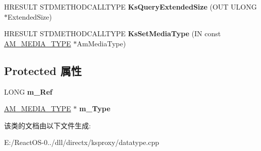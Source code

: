 \begin{DoxyCompactItemize}
\mbox{\label{class_c_ks_data_type_handler_aa5fa030b26b8dccb0db829660826d6d1}} 
H\+R\+E\+S\+U\+LT S\+T\+D\+M\+E\+T\+H\+O\+D\+C\+A\+L\+L\+T\+Y\+PE {\bfseries Ks\+Query\+Extended\+Size} (O\+UT U\+L\+O\+NG $\ast$Extended\+Size)
\item 
\mbox{\label{class_c_ks_data_type_handler_a3fb9e87c052e6c8e18c23ebcfa026bbb}} 
H\+R\+E\+S\+U\+LT S\+T\+D\+M\+E\+T\+H\+O\+D\+C\+A\+L\+L\+T\+Y\+PE {\bfseries Ks\+Set\+Media\+Type} (IN const \hyperlink{struct_a_m___m_e_d_i_a___t_y_p_e}{A\+M\+\_\+\+M\+E\+D\+I\+A\+\_\+\+T\+Y\+PE} $\ast$Am\+Media\+Type)
\end{DoxyCompactItemize}
\subsection*{Protected 属性}
\begin{DoxyCompactItemize}
\item 
\mbox{\label{class_c_ks_data_type_handler_a19c970144b9dd3ae882ee6ad68432f0d}} 
L\+O\+NG {\bfseries m\+\_\+\+Ref}
\item 
\mbox{\label{class_c_ks_data_type_handler_a285115164cf8d47920da45c28141ce2c}} 
\hyperlink{struct_a_m___m_e_d_i_a___t_y_p_e}{A\+M\+\_\+\+M\+E\+D\+I\+A\+\_\+\+T\+Y\+PE} $\ast$ {\bfseries m\+\_\+\+Type}
\end{DoxyCompactItemize}


该类的文档由以下文件生成\+:\begin{DoxyCompactItemize}
\item 
E\+:/\+React\+O\+S-\/0../dll/directx/ksproxy/datatype.\+cpp\end{DoxyCompactItemize}
